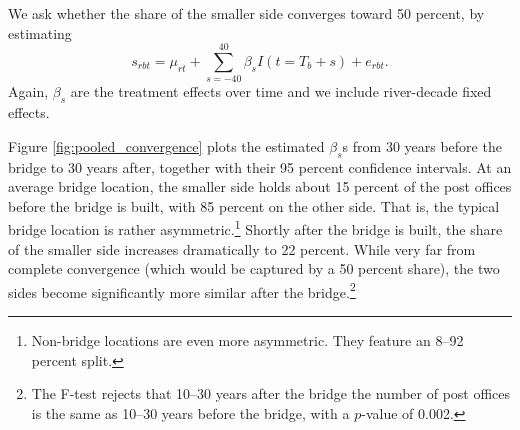 We ask whether the share of the smaller side converges toward 50 percent, by estimating
\[
s_{rbt}		 = 
 	\mu_{rt}+\sum_{s=-40}^{40}\beta_s I(t=T_b+s) + e_{rbt}.
\]
Again, $\beta_s$ are the treatment effects over time and we include river-decade fixed effects.

Figure \ref{fig:pooled_convergence} plots the estimated $\beta_s$s from 30 years before the bridge to 30 years after, together with their 95 percent confidence intervals. At an average bridge location, the smaller side holds about 15 percent of the post offices before the bridge is built, with 85 percent on the other side. That is, the typical bridge location is rather asymmetric.\footnote{Non-bridge locations are even more asymmetric. They feature an 8--92 percent split.} Shortly after the bridge is built, the share of the smaller side increases dramatically to 22 percent. While very far from complete convergence (which would be captured by a 50 percent share), the two sides become significantly more similar after the bridge.\footnote{The F-test rejects that 10--30 years after the bridge the number of post offices is the same as 10--30 years before the bridge, with a $p$-value of 0.002.}

